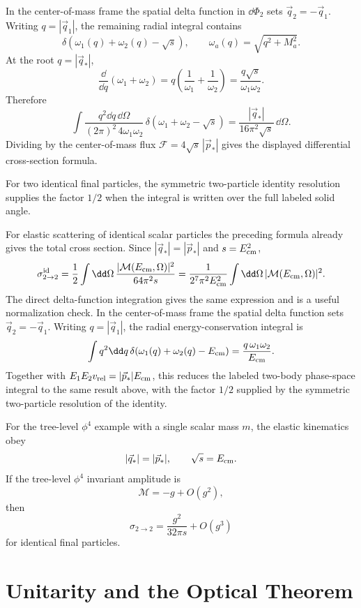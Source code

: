 In the center-of-mass frame the spatial delta function in
\(\dd\Phi_2\) sets \(\vec q_2=-\vec q_1\).  Writing
\(q=|\vec q_1|\), the remaining radial integral contains
\[
  \delta(\omega_1(q)+\omega_2(q)-\sqrt s),
  \qquad
  \omega_a(q)=\sqrt{q^2+M_a^2}.
\]
At the root \(q=|\vec q_*|\),
\[
  \frac{\dd}{\dd q}(\omega_1+\omega_2)
  =
  q\left(\frac1{\omega_1}+\frac1{\omega_2}\right)
  =
  \frac{q\sqrt s}{\omega_1\omega_2}.
\]
Therefore
\[
  \int\frac{q^2\dd q\,\dd\Omega}{(2\pi)^2\,4\omega_1\omega_2}\,
  \delta(\omega_1+\omega_2-\sqrt s)
  =
  \frac{|\vec q_*|}{16\pi^2\sqrt s}\,\dd\Omega .
\]
Dividing by the center-of-mass flux
\(\mathcal F=4\sqrt s\,|\vec p_*|\) gives the displayed differential
cross-section formula.

For two identical final particles, the symmetric two-particle identity
resolution supplies the factor \(1/2\) when the integral is written over the
full labeled solid angle.

For elastic scattering of identical scalar particles the preceding formula
already gives the total cross section.  Since
\(|\vec q_*|=|\vec p_*|\) and \(s=E_{\rm cm}^2\),
\[
  \sigma_{2\to2}^{\rm id}
  =
  \frac12
  \int\dd\Omega\,
  \frac{|\mathcal M(E_{\rm cm},\Omega)|^2}{64\pi^2s}
  =
  \frac{1}{2^7\pi^2E_{\rm cm}^2}
  \int\dd\Omega\,|\mathcal M(E_{\rm cm},\Omega)|^2 .
\]
The direct delta-function integration gives the same expression and is a useful
normalization check.  In the center-of-mass frame the spatial delta function
sets \(\vec q_2=-\vec q_1\).  Writing \(q=|\vec q_1|\), the radial
energy-conservation integral is
\[
  \int q^2\dd q\,
  \delta(\omega_1(q)+\omega_2(q)-E_{\rm cm})
  =
  \frac{q\,\omega_1\omega_2}{E_{\rm cm}}.
\]
Together with \(E_1E_2v_{\rm rel}=|\vec p_*|E_{\rm cm}\), this reduces the
labeled two-body phase-space integral to the same result above, with the
factor \(1/2\) supplied by the symmetric two-particle resolution of the
identity.

For the tree-level \(\phi^4\) example with a single scalar mass \(m\), the
elastic kinematics obey
\[
  |\vec q_*|=|\vec p_*|,
  \qquad
  \sqrt s=E_{\rm cm}.
\]
If the tree-level \(\phi^4\) invariant amplitude is
\[
  \mathcal M=-g+O(g^2),
\]
then
\[
  \sigma_{2\to2}
  =
  \frac{g^2}{32\pi s}+O(g^3)
\]
for identical final particles.

\section{Unitarity and the Optical Theorem}

